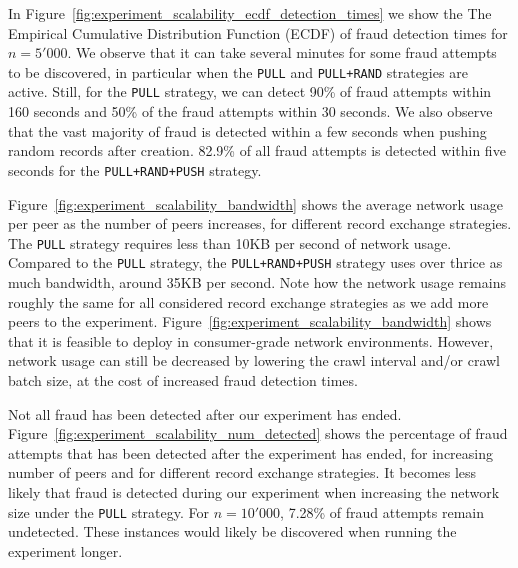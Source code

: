 In Figure~\ref{fig:experiment_scalability_ecdf_detection_times} we show the The Empirical Cumulative Distribution Function (ECDF) of fraud detection times for $ n = 5'000 $.
We observe that it can take several minutes for some fraud attempts to be discovered, in particular when the \texttt{PULL} and \texttt{PULL+RAND} strategies are active.
Still, for the \texttt{PULL} strategy, we can detect 90\% of fraud attempts within 160 seconds and 50\% of the fraud attempts within 30 seconds.
We also observe that the vast majority of fraud is detected within a few seconds when pushing random records after creation.
82.9\% of all fraud attempts is detected within five seconds for the \texttt{PULL+RAND+PUSH} strategy.

Figure~\ref{fig:experiment_scalability_bandwidth} shows the average network usage per peer as the number of peers increases, for different record exchange strategies.
The \texttt{PULL} strategy requires less than 10KB per second of network usage.
Compared to the \texttt{PULL} strategy, the \texttt{PULL+RAND+PUSH} strategy uses over thrice as much bandwidth, around 35KB per second.
Note how the network usage remains roughly the same for all considered record exchange strategies as we add more peers to the experiment.
Figure~\ref{fig:experiment_scalability_bandwidth} shows that it is feasible to deploy \ModelName{} in consumer-grade network environments.
However, network usage can still be decreased by lowering the crawl interval and/or crawl batch size, at the cost of increased fraud detection times.

Not all fraud has been detected after our experiment has ended.
Figure~\ref{fig:experiment_scalability_num_detected} shows the percentage of fraud attempts that has been detected after the experiment has ended, for increasing number of peers and for different record exchange strategies.
It becomes less likely that fraud is detected during our experiment when increasing the network size under the \texttt{PULL} strategy.
For $ n = 10'000 $, 7.28\% of fraud attempts remain undetected.
These instances would likely be discovered when running the experiment longer.


